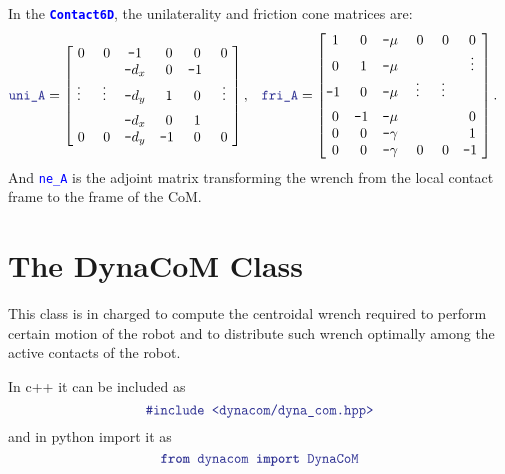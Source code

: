 \documentclass[12pt]{article}
\newcommand{\code}[2][Blue]{\textcolor{#1}{\texttt{#2}}}
\newcommand{\codebf}[2][Blue]{\textcolor{#1}{\texttt{\textbf{#2}}}}
\begin{document}
In the \codebf{Contact6D}, the unilaterality and friction cone matrices are:
%
\begin{align*}
    &\code{uni\_A} = \begin{bmatrix}
       ~0        & ~0     & \texttt{-}1   & ~0 & ~0  & ~0~ \\
               &        & \texttt{-}d_x & ~0 & \texttt{-}1 &  \\
       \vspace{2mm}\vdots  & \vdots & \texttt{-}d_y & ~1 & ~0 & \vdots \\
               &         & \texttt{-}d_x & ~0 & ~1 &   \\
       ~0        &   ~0    & \texttt{-}d_y & \texttt{-}1 & ~0 & ~0~ \\
    \end{bmatrix}, &&
    \code{fri\_A} = \begin{bmatrix}
        ~1 & ~0 & \texttt{-}\mu & ~0   & ~0  & ~0~ \\
        ~0 & ~1 & \texttt{-}\mu &     &    &  \vdots \\
        \texttt{-}1 & ~0 & \texttt{-}\mu & \vspace{2mm}\vdots   & \vdots   &    \\
        ~0 & \texttt{-}1 & \texttt{-}\mu &    &    & ~0~ \\
        ~0 & ~0 & \texttt{-}\gamma &  &    & ~1~ \\
        ~0 & ~0 & \texttt{-}\gamma &  ~0 &  ~0  & \texttt{-}1~ 
    \end{bmatrix}.
\end{align*}
 And \code{ne\_A} is the adjoint matrix transforming the wrench from the local contact frame to the frame of the CoM. 

\clearpage

\section{The DynaCoM Class}

    This class is in charged to compute the centroidal wrench required to perform certain motion of the robot and to distribute such wrench optimally among the active contacts of the robot.

    In c++ it can be included as 
    \begin{equation*}
    \code{\#include <dynacom/dyna\_com.hpp>}
    \end{equation*}
    and in python import it as
    \begin{equation*}
    \codebf{from }\code{dynacom }\codebf{import }\code{DynaCoM}
    \end{equation*}
\end{document}

